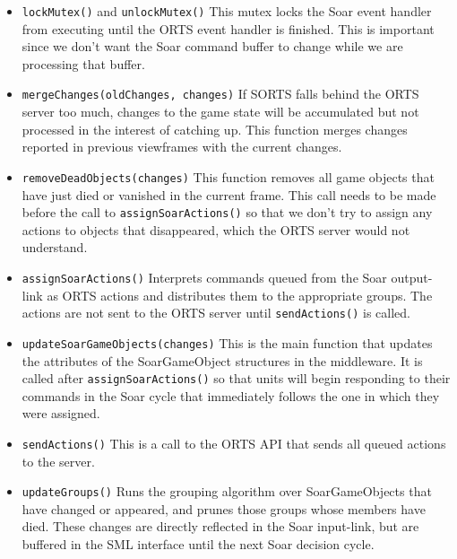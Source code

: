 \begin{itemize}

\item \verb|lockMutex()| and \verb|unlockMutex()|
  This mutex locks the Soar event handler from executing until the
  ORTS event handler is finished. This is important since we don't want
  the Soar command buffer to change while we are processing that buffer.

\item \verb|mergeChanges(oldChanges, changes)|
  If SORTS falls behind the ORTS server too much, changes to the game
  state will be accumulated but not processed in the interest of
  catching up. This function merges changes reported in previous
  viewframes with the current changes.

\item \verb|removeDeadObjects(changes)|
  This function removes all game objects that have just died or vanished
  in the current frame. This call needs to be made before the call to
  \verb|assignSoarActions()| so that we don't try to assign any actions
  to objects that disappeared, which the ORTS server would not
  understand.

\item \verb|assignSoarActions()|
  Interprets commands queued from the Soar output-link as ORTS actions and
  distributes them to the appropriate groups. The actions are not sent
  to the ORTS server until \verb|sendActions()| is called.

\item \verb|updateSoarGameObjects(changes)|
  This is the main function that updates the attributes of the
  SoarGameObject structures in the middleware. It is called after
  \verb|assignSoarActions()| so that units will begin responding to
  their commands in the Soar cycle that immediately follows the one in
  which they were assigned.

\item \verb|sendActions()|
  This is a call to the ORTS API that sends all queued actions to the
  server.

\item \verb|updateGroups()|
  Runs the grouping algorithm over SoarGameObjects that have changed or
  appeared, and prunes those groups whose members have died. These
  changes are directly reflected in the Soar input-link, but are
  buffered in the SML interface until the next Soar decision cycle.

\end{itemize}

